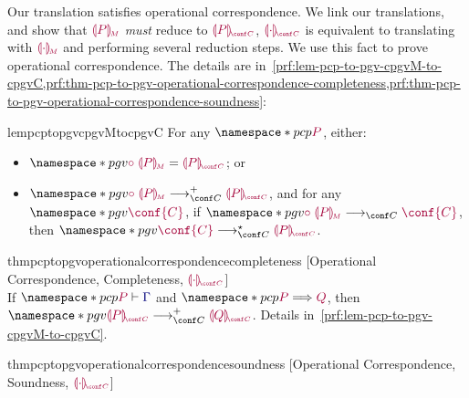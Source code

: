 \documentclass[main.tex]{subfiles}
\begin{document}
Our translation satisfies operational correspondence. We link our translations, and show that $\tm{\cpgvM{P}}$ \emph{must} reduce to $\tm{\cpgvC{P}}$, \ie $\tm{\cpgvC{\cdot}}$ is equivalent to translating with $\tm{\cpgvM{\cdot}}$ and performing several reduction steps. We use this fact to prove operational correspondence. The details are in~\cref{prf:lem-pcp-to-pgv-cpgvM-to-cpgvC,prf:thm-pcp-to-pgv-operational-correspondence-completeness,prf:thm-pcp-to-pgv-operational-correspondence-soundness}:
\begin{compacttheorems}
  \begin{restatablelemma}{lempcptopgvcpgvMtocpgvC}
    \label{lem:pcp-to-pgv-cpgvM-to-cpgvC}
    For any $\pcp{\tm{P}}$, either:
    \begin{itemize}
    \item $\pgv{\tm{\child\;\cpgvM{P}}=\tm{\cpgvC{P}}}$; or
    \item   $\pgv{\tm{\child\;\cpgvM{P}}\cred^+\tm{\cpgvC{P}}}$, and for any $\pgv{\tm{\conf{C}}}$, if $\pgv{\tm{\child\;\cpgvM{P}}\cred\tm{\conf{C}}}$, then $\pgv{\tm{\conf{C}}\cred^\star\tm{\cpgvC{P}}}$.
    \end{itemize}
  \end{restatablelemma}
  \begin{restatabletheorem}{thmpcptopgvoperationalcorrespondencecompleteness}%
    [Operational Correspondence, Completeness, ${\tm{\cpgvC{\cdot}}}$]
    \label{thm:pcp-to-pgv-operational-correspondence-completeness}
    \hfill\\%
    If $\pcp{\seq{P}{\ty{\Gamma}}}$ and $\pcp{\tm{P}\red\tm{Q}}$,
    then $\pgv{\tm{\cpgvC{P}}\cred^+\tm{\cpgvC{Q}}}$. Details in~\cref{prf:lem-pcp-to-pgv-cpgvM-to-cpgvC}.
  \end{restatabletheorem}
  \begin{restatabletheorem}{thmpcptopgvoperationalcorrespondencesoundness}%
    [Operational Correspondence, Soundness, ${\tm{\cpgvC{\cdot}}}$]
    \label{thm:pcp-to-pgv-operational-correspondence-soundness}

\end{restatabletheorem}
\end{compacttheorems}
\end{document}
